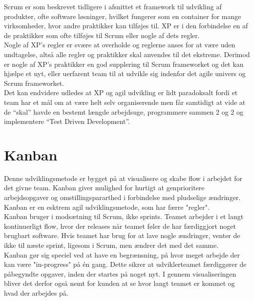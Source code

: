 Scrum er som beskrevet tidligere i afsnittet et framework til udvikling af produkter, ofte software løsninger, 
hvilket fungerer som en container for mange virksomheder, hvor andre praktikker kan tilføjes til. XP er i den 
forbindelse en af de praktikker som ofte tilføjes til Scrum eller nogle af dets regler. \\

Nogle af XP’s regler er svære at overholde og reglerne anses for at være uden undtagelse, altså alle regler 
og praktikker skal anvendes til det ekstreme. Derimod er nogle af XP’s praktikker en god supplering til 
Scrum frameworket og det kan hjælpe et nyt, eller uerfarent team til at udvikle sig indenfor det agile 
univers og Scrum frameworket. \\

Det kan endvidere udledes at XP og agil udvikling er lidt paradoksalt fordi et team har et mål om at være helt selv organiserende men får 
samtidigt at vide at de “skal” havde en bestemt længde arbejdsuge, programmere sammen 2 og 2 og implementere “Test Driven Development”. 

\section{Kanban}\label{sec:kanban}
Denne udviklingsmetode er bygget på at visualisere og skabe flow i arbejdet for det givne team. Kanban giver 
mulighed for hurtigt at genprioritere arbejdsopgaver og omstillingspararthed i forbindelse med pludselige ændringer. 
Kanban er en esktrem agil udviklingsmetode, som har færre "regler".\\

Kanban\cite{Kanban} bruger i modsætning til Scrum, ikke sprints. Teamet arbejder i et langt kontinuerligt flow, hvor der releases
når teamet føler de har færdiggjort noget brugbart software. Hvis teamet har brug for at lave nogle ændringer,
venter de ikke til næste sprint, ligesom i Scrum, men ændrer det med det samme. \\

Kanban gør sig speciel ved at have en begrænsning, på hvor meget arbejde der kan være "in-progress" på én gang. 
Dette sikrer at udviklerteamet færdiggører de påbegyndte opgaver, inden der startes på noget nyt. 
I gennem visualiseringen bliver det derfor også nemt for kunden at se hvor langt teamet er kommet og
hvad der arbejdes på.

